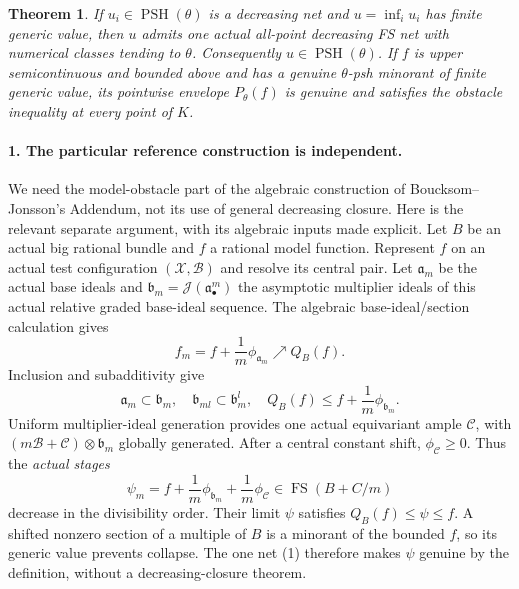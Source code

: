 \documentclass[10pt]{article}
\newtheorem{theorem}{Theorem}
\newcommand{\PSH}{\operatorname{PSH}}
\newcommand{\FS}{\operatorname{FS}}
\begin{document}
\begin{theorem}\label{thm:closure}
If $u_i\in\PSH(\theta)$ is a decreasing net and
$u=\inf_i u_i$ has finite generic value, then $u$ admits one actual
all-point decreasing FS net with numerical classes tending to $\theta$.
Consequently $u\in\PSH(\theta)$. If $f$ is upper semicontinuous and
bounded above and has a genuine $\theta$-psh minorant of finite generic
value, its pointwise envelope $P_\theta(f)$ is genuine and satisfies
the obstacle inequality at every point of $K$.
\end{theorem}

\paragraph{1. The particular reference construction is independent.}
We need the model-obstacle part of the algebraic construction of
Boucksom--Jonsson's Addendum, not its use of general decreasing closure.
Here is the relevant separate argument, with its algebraic inputs
made explicit. Let $B$ be an actual big rational bundle and $f$ a
rational model function. Represent $f$ on an actual test configuration
$(\mathcal X,\mathcal B)$ and resolve its central pair. Let
$\mathfrak a_m$ be the actual base ideals and
$\mathfrak b_m=\mathcal J(\mathfrak a_\bullet^m)$ the asymptotic multiplier
ideals of this actual relative graded base-ideal sequence.
The algebraic base-ideal/section calculation gives
\[
 f_m=f+\frac1m\phi_{\mathfrak a_m}\nearrow Q_B(f).
\]
Inclusion and subadditivity give
\[
 \mathfrak a_m\subset\mathfrak b_m,
 \quad \mathfrak b_{ml}\subset\mathfrak b_m^l,
 \quad Q_B(f)\le f+\frac1m\phi_{\mathfrak b_m}.
\]
Uniform multiplier-ideal generation provides one actual equivariant
ample $\mathcal C$, with $(m\mathcal B+\mathcal C)\otimes\mathfrak b_m$
globally generated. After a central constant shift, $\phi_\mathcal C\ge0$.
Thus the \emph{actual stages}
\[
 \psi_m=f+\frac1m\phi_{\mathfrak b_m}
               +\frac1m\phi_\mathcal C
       \in\FS(B+C/m)                                  \tag{1}
\]
decrease in the divisibility order. Their limit $\psi$ satisfies
$Q_B(f)\le\psi\le f$. A shifted nonzero section of a multiple of $B$
is a minorant of the bounded $f$, so its generic value prevents collapse.
The one net (1) therefore makes $\psi$ genuine by the definition,
without a decreasing-closure theorem.
\end{document}
